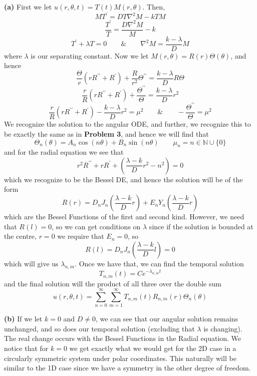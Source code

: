 \documentclass[10pt]{article}
\begin{document}
\textbf{(a)}
First we let $u(r,\theta,t) = T(t)M(r,\theta)$. Then,
$$MT^{\prime} = DT\nabla^{2}M - kTM$$
$$\frac{T^{\prime}}{T} = \frac{D\nabla^{2}M}{M} - k$$
$$T^{\prime} + \lambda T = 0 \hspace{2em} \& \hspace{2em} \nabla^{2}M = \frac{k - \lambda}{D}M$$
where $\lambda$ is our separating constant. Now we let $M(r,\theta) = R(r)\Theta(\theta)$, and hence
$$\frac{\Theta}{r}\left(rR^{\prime\prime} + R^{\prime}\right) + \frac{R}{r^{2}}\Theta^{\prime\prime} = \frac{k-\lambda}{D}R\Theta$$
$$\frac{r}{R}\left(rR^{\prime\prime} + R^{\prime}\right) + \frac{\Theta^{\prime\prime}}{\Theta} = \frac{k-\lambda}{D}r^{2}$$
$$\frac{r}{R}\left(rR^{\prime\prime} + R^{\prime}\right) - \frac{k-\lambda}{D}r^{2} = \mu^{2} \hspace{2em} \& \hspace{2em} -\frac{\Theta^{\prime\prime}}{\Theta} = \mu^{2}$$
We recognize the solution to the angular ODE, and further, we recognize this to be exactly the same as in \textbf{Problem 3}, and hence we will find that
$$\Theta_{n}(\theta) = A_{n}\cos(n\theta) + B_{n}\sin(n\theta) \hspace{2em} \mu_{n}=n\in\mathbb{N}\cup\{0\}$$
and for the radial equation we see that
$$r^{2}R^{\prime\prime} + rR^{\prime} + \left(\frac{\lambda - k}{D}r^{2} - n^{2}\right) = 0$$
which we recognize to be the Bessel DE, and hence the solution will be of the form
$$R(r) = D_{n}J_{n}\left(\frac{\lambda - k}{D}r\right) + E_{n}Y_{n}\left(\frac{\lambda-k}{D}r\right)$$
which are the Bessel Functions of the first and second kind. However, we need that $R(l) = 0$, so we can get conditions on $\lambda$ since if the solution is bounded at the centre, $r=0$ we require that $E_{n} = 0$, so
$$R(l) = D_{n}J_{n}\left(\frac{\lambda - k}{D}l\right) = 0$$ 
which will give us $\lambda_{n,m}$. Once we have that, we can find the temporal solution
$$T_{n,m}(t) = Ce^{-\lambda_{n,m}t}$$
and the final solution will the product of all three over the double sum
$$u(r,\theta,t) = \sum_{n=0}^{\infty}\sum_{m=1}^{\infty}T_{n,m}(t)R_{n,m}(r)\Theta_{n}(\theta)$$

\textbf{(b)}
If we let $k=0$ and $D\neq 0$, we can see that our angular solution remains unchanged, and so does our temporal solution (excluding that $\lambda$ is changing). The real change occurs with the Bessel Functions in the Radial equation. We notice that for $k=0$ we get exactly what we would get for the 2D case in a circularly symmetric system under polar coordinates. This naturally will be similar to the 1D case since we have a symmetry in the other degree of freedom.
\end{document}
